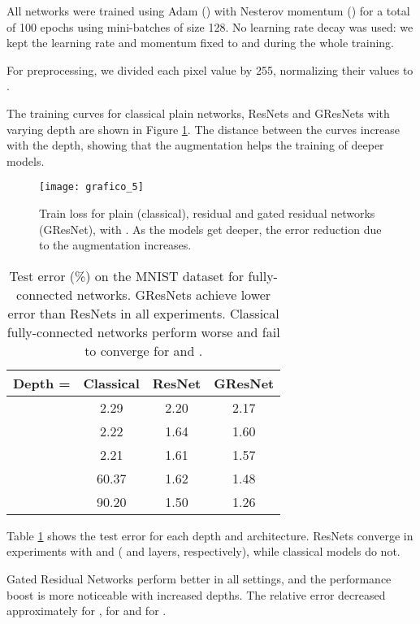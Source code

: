 \documentclass{article} \RequirePackage{amsmath,amsthm,amsfonts,amssymb}
\begin{document}
All networks were trained using Adam (\cite{adam}) with Nesterov momentum (\cite{adamnest}) for a total of 100 epochs using mini-batches of size 128. No learning rate decay was used: we kept the learning rate and momentum fixed to  and  during the whole training.

For preprocessing, we divided each pixel value by 255, normalizing their values to .

The training curves for classical plain networks, ResNets and GResNets with varying depth are shown in Figure \ref{mnist_loss}. The distance between the curves increase with the depth, showing that the augmentation helps the training of deeper models.

\begin{figure}[!ht]
  \centering
    \texttt{[image: grafico\_5]}
  \caption{Train loss for plain (classical), residual and gated residual networks (GResNet), with . As the models get deeper, the error reduction due to the augmentation increases.}
\label{mnist_loss}
\end{figure}


\begin{table}[h!]
\centering
    \begin{tabular}{ | l | c | c | c |}
    \hline
    Depth =  & Classical & ResNet & GResNet \\ \hline
      & 			2.29 & 	2.20 & 	2.17 \\ \hline
     & 			2.22 & 	1.64 & 	1.60 \\ \hline
     & 			2.21 & 	1.61 & 	1.57 \\ \hline
     & 			60.37 & 	1.62 & 	1.48 	\\ \hline
     &		90.20 & 	1.50 & 	1.26 	\\ \hline
    \end{tabular}
\caption{Test error (\%) on the MNIST dataset for fully-connected networks. GResNets achieve lower error than ResNets in all experiments. Classical fully-connected networks perform worse and fail to converge for  and .}
    \label{mnist_table}   
\end{table}

Table \ref{mnist_table} shows the test error for each depth and architecture. ResNets converge in experiments with  and  ( and  layers, respectively), while classical models do not. 

Gated Residual Networks perform better in all settings, and the performance boost is more noticeable with increased depths. The relative error decreased approximately  for ,  for  and  for .
\end{document}
